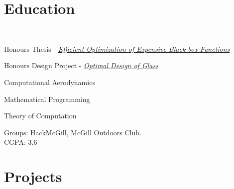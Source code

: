 \documentclass[letterpaper]{deedy-resume} %
\begin{document}

\section{Education}

 \\

\begin{tightitemize}
\item Honours Thesis - \href{https://dl.dropboxusercontent.com/u/14503566/thesis.pdf}{\textit{Efficient Optimization of Expensive Black-box Functions}}

\item Honours Design Project - \href{https://dl.dropboxusercontent.com/u/14503566/thesis.pdf}{\textit{Optimal
Design of Glass}}
\end{tightitemize}

\insectionspace
{}
\begin{tightitemize}
\item Computational Aerodynamics
\item Mathematical Programming
\item Theory of Computation

\end{tightitemize}
\insectionspace

Groups: HackMcGill, McGill Outdoors Club.
\\[\fpeval{\baseheight * \golden}]
CGPA: 3.6

\sectionspace %

\section{Projects}

\end{document}
